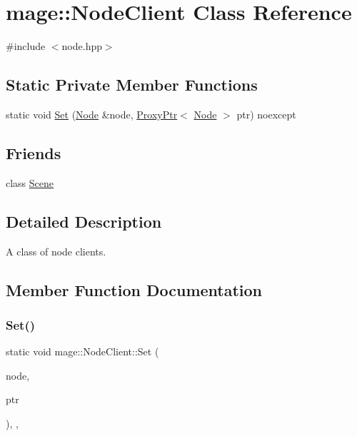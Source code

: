 \hypertarget{classmage_1_1_node_client}{}\section{mage\+:\+:Node\+Client Class Reference}
\label{classmage_1_1_node_client}


{\ttfamily \#include $<$node.\+hpp$>$}

\subsection*{Static Private Member Functions}
\begin{DoxyCompactItemize}
\item 
static void \hyperlink{classmage_1_1_node_client_a2c3022ac86c892d2d859feb72e9f01b1}{Set} (\hyperlink{classmage_1_1_node}{Node} \&node, \hyperlink{classmage_1_1_proxy_ptr}{Proxy\+Ptr}$<$ \hyperlink{classmage_1_1_node}{Node} $>$ ptr) noexcept
\end{DoxyCompactItemize}
\subsection*{Friends}
\begin{DoxyCompactItemize}
\item 
class \hyperlink{classmage_1_1_node_client_a032858ae1fe02d2d1170981c2af2d67c}{Scene}
\end{DoxyCompactItemize}


\subsection{Detailed Description}
A class of node clients. 

\subsection{Member Function Documentation}
\hypertarget{classmage_1_1_node_client_a2c3022ac86c892d2d859feb72e9f01b1}{}\label{classmage_1_1_node_client_a2c3022ac86c892d2d859feb72e9f01b1} 
\subsubsection{\texorpdfstring{Set()}{Set()}}
{\footnotesize\ttfamily static void mage\+::\+Node\+Client\+::\+Set (\begin{DoxyParamCaption}\item[{\hyperlink{classmage_1_1_node}{Node} \&}]{node,  }\item[{\hyperlink{classmage_1_1_proxy_ptr}{Proxy\+Ptr}$<$ \hyperlink{classmage_1_1_node}{Node} $>$}]{ptr }\end{DoxyParamCaption})\hspace{0.3cm}{\ttfamily [static]}, {\ttfamily [private]}, {\ttfamily [noexcept]}}

